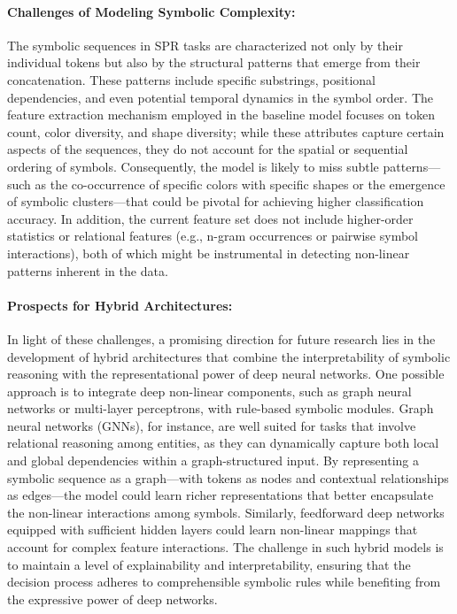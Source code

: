 \documentclass{article}
\begin{document}
\paragraph{Challenges of Modeling Symbolic Complexity:} The symbolic sequences in SPR tasks are characterized not only by their individual tokens but also by the structural patterns that emerge from their concatenation. These patterns include specific substrings, positional dependencies, and even potential temporal dynamics in the symbol order. The feature extraction mechanism employed in the baseline model focuses on token count, color diversity, and shape diversity; while these attributes capture certain aspects of the sequences, they do not account for the spatial or sequential ordering of symbols. Consequently, the model is likely to miss subtle patterns—such as the co-occurrence of specific colors with specific shapes or the emergence of symbolic clusters—that could be pivotal for achieving higher classification accuracy. In addition, the current feature set does not include higher-order statistics or relational features (e.g., n-gram occurrences or pairwise symbol interactions), both of which might be instrumental in detecting non-linear patterns inherent in the data.

\paragraph{Prospects for Hybrid Architectures:} In light of these challenges, a promising direction for future research lies in the development of hybrid architectures that combine the interpretability of symbolic reasoning with the representational power of deep neural networks. One possible approach is to integrate deep non-linear components, such as graph neural networks or multi-layer perceptrons, with rule-based symbolic modules. Graph neural networks (GNNs), for instance, are well suited for tasks that involve relational reasoning among entities, as they can dynamically capture both local and global dependencies within a graph-structured input. By representing a symbolic sequence as a graph—with tokens as nodes and contextual relationships as edges—the model could learn richer representations that better encapsulate the non-linear interactions among symbols. Similarly, feedforward deep networks equipped with sufficient hidden layers could learn non-linear mappings that account for complex feature interactions. The challenge in such hybrid models is to maintain a level of explainability and interpretability, ensuring that the decision process adheres to comprehensible symbolic rules while benefiting from the expressive power of deep networks.
\end{document}
